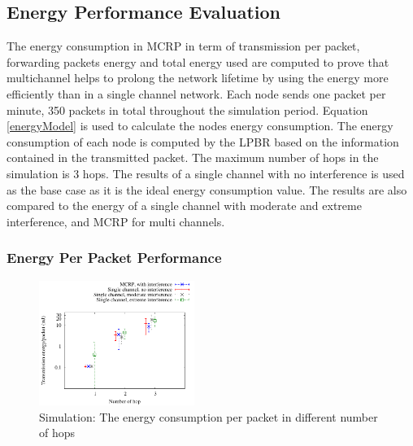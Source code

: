 \subsection{Energy Performance Evaluation}


The energy consumption in MCRP in term of transmission per packet, forwarding packets energy and total energy used are computed to prove that multichannel helps to prolong the network lifetime by using the energy more efficiently than in a single channel network. Each node sends one packet per minute, 350 packets in total throughout the simulation period. Equation \ref{energyModel} is used to calculate the nodes energy consumption. The energy consumption of each node is computed by the LPBR based on the information contained in the transmitted packet. The maximum number of hops in the simulation is 3 hops. The results of a single channel with no interference is used as the base case as it is the ideal energy consumption value. The results are also compared to the energy of a single channel with moderate and extreme interference, and MCRP for multi channels.


\subsubsection{Energy Per Packet Performance}

\begin{figure}
\centering
\includegraphics[width=0.45\textwidth]{figures/perPktEnergy.pdf}
\caption{Simulation: The energy consumption per packet in different number of hops}
\label{fig:energyPerPkt}
\end{figure}

